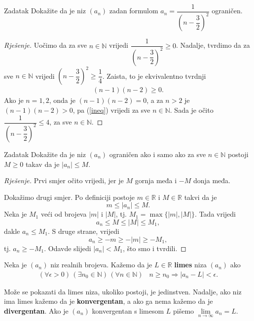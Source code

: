 \begin{exercise}{Zadatak}
Dokažite da je niz \((a_n)\) zadan formulom \(a_n=\dfrac{1}{\left(n-\dfrac{3}{2}\right)^2}\) ograničen.
\end{exercise}
\begin{proof}[Rješenje]
Uočimo da za sve \(n\in \mathbb{N}\) vrijedi \(\dfrac{1}{\left(n-\dfrac{3}{2}\right)^2}\geq 0\). Nadalje, tvrdimo da za sve \(n\in \mathbb{N}\) vrijedi \(\left(n-\dfrac{3}{2}\right)^2\geq \dfrac{1}{4}\). Zaista, to je ekvivalentno tvrdnji 
\begin{gather}
\label{ineq}
(n-1)(n-2)\geq 0.
\end{gather}
Ako je \(n=1, 2\), onda je \((n-1)(n-2)=0\), a za \(n>2\) je \((n-1)(n-2)>0\), pa (\ref{ineq}) vrijedi za sve \(n\in \mathbb{N}\). Sada je očito \(\dfrac{1}{\left(n-\dfrac{3}{2}\right)^2}\leq 4\), za sve \(n\in \mathbb{N}\).
\end{proof}
\begin{exercise}{Zadatak}
Dokažite da je niz \((a_n)\) ograničen ako i samo ako za sve \(n\in \mathbb{N}\) postoji \(M\geq 0\) takav da je \(|a_n|\leq M\).
\end{exercise}
\begin{proof}[Rješenje]
Prvi smjer očito vrijedi, jer je \(M\) gornja međa i \(-M\) donja međa. 

Dokažimo drugi smjer. Po definiciji postoje \(m\in \mathbb{R}\) i \(M\in \mathbb{R}\) takvi da je \[m\leq |a_n|\leq M.\] Neka je \(M_1\) veći od brojeva \(|m|\) i \(|M|\), tj. \(M_1=\max\{|m|, |M|\}\). Tada vrijedi \[a_n\leq M\leq |M|\leq M_1,\]
dakle \(a_n\leq M_1\). S druge strane, vrijedi \[a_n\geq -m\geq -|m|\geq -M_1,\] 
tj. \(a_n\geq -M_1\). Odavde slijedi \(|a_n|<M_1\), što smo i tvrdili.
\end{proof}

\begin{definition}
Neka je \((a_n)\) niz realnih brojeva. Kažemo da je \(L\in \mathbb{R}\) \textbf{limes} niza \((a_n)\) ako
\begin{gather*}
(\forall \epsilon>0)\,(\exists n_0\in \mathbb{N})\, (\forall n\in \mathbb{N})\;\;\; n\geq n_0\Rightarrow |a_n-L|<\epsilon.
\end{gather*}
\end{definition}

Može se pokazati da limes niza, ukoliko postoji, je jedinstven. Nadalje, ako niz ima limes kažemo da je \textbf{konvergentan}, a ako ga nema kažemo da je \textbf{divergentan}. Ako je \((a_n)\) konvergentan s limesom \(L\) pišemo \(\lim\limits_{n\to \infty}{a_n}=L\).

